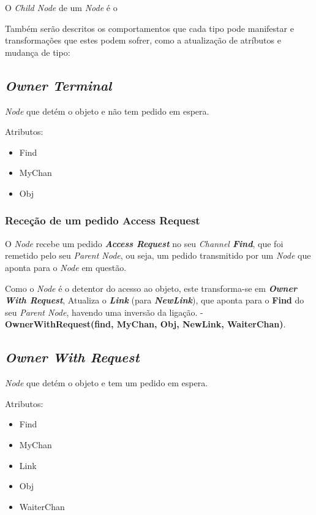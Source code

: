 O \emph{Child Node} de um \emph{Node} é o

Também serão descritos os comportamentos que cada tipo pode manifestar e transformações que estes podem sofrer, como a atualização de atríbutos e mudança de tipo:


\subsection{\emph{Owner Terminal}}
\label{especificacao:nodes:owner_terminal}


\emph{Node} que detém o objeto e não tem pedido em espera.

Atributos:
\begin{itemize}
    \item Find
    \item MyChan
    \item Obj
\end{itemize}


\subsubsection*{Receção de um pedido Access Request}
O \emph{Node} recebe um pedido \emph{\textbf{Access Request}} no seu \emph{Channel \textbf{Find}},
que foi remetido pelo seu \emph{Parent Node}, ou seja, um pedido transmitido por um \emph{Node} que aponta para o \emph{Node} em questão.


Como o \emph{Node} é o detentor do acesso ao objeto, este transforma-se em \emph{\textbf{Owner With Request}},
Atualiza o \textbf{\emph{Link}} (para \textbf{\emph{NewLink}}),
que aponta para o \textbf{Find} do seu \emph{Parent Node}, havendo uma inversão da ligação.
-\textbf{ OwnerWithRequest(find, MyChan, Obj, NewLink, WaiterChan)}.




\subsection{\emph{Owner With Request}}
\label{especificacao:nodes:owner_with_request}

\emph{Node} que detém o objeto e tem um pedido em espera.

Atributos:
\begin{itemize}
    \item Find
    \item MyChan
    \item Link
    \item Obj
    \item WaiterChan
\end{itemize}

